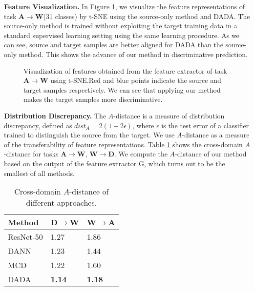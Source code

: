 \documentclass{ecai}
\begin{document}
\textbf{Feature Visualization.} In Figure \ref{Visualization}, we visualize the feature representations of task \textbf{A}$\rightarrow$\textbf{W}(31 classes) by t-SNE\cite{b41} using the source-only method and DADA. The source-only method is trained without exploiting the target training data in a standard supervised learning setting using the same learning procedure. As we can see, source and target samples are better aligned for DADA than the source-only method. This shows the advance of our method in discriminative prediction.

\setlength{\abovecaptionskip}{-0.1cm}  

\begin{figure}[htbp]
\centering
{}
\caption{Visualization of features obtained from the feature extractor of task \textbf{A}$\rightarrow$\textbf{W} using t-SNE\cite{b41}.Red and blue points indicate the source and target samples respectively. We can see that applying our method makes the target samples more discriminative.}
\label{Visualization}
\end{figure}


\textbf{Distribution Discrepancy.} The $A$-distance is a measure of distribution discrepancy, defined as $dist_A = 2 (1-2\epsilon)$, where $\epsilon$ is the test error of a classifier trained to distinguish the source from the target. We use $A$-distance as a measure of the transferability of feature representations. Table \ref{A-distance} shows the cross-domain $A$-distance for tasks \textbf{A}$\rightarrow$\textbf{W}, \textbf{W}$\rightarrow$\textbf{D}. We compute the $A$-distance of our method based on the output of the feature extractor G, which turns out to be the smallest of all methods.

\begin{table}
\centering
\caption{Cross-domain $A$-distance of different approaches.}
\begin{tabular}{lp{2.0cm}<{\centering}p{2.0cm}<{\centering}}
\toprule
Method&   D$\rightarrow$W&   W$\rightarrow$A\\
\midrule
ResNet-50\cite{b36}&  1.27&   1.86\\
DANN\cite{b18}&       1.23&   1.44\\
MCD\cite{b24}&        1.22&   1.60\\
DADA&     \textbf{1.14}& \textbf{1.18}\\
\bottomrule
\end{tabular}
\label{A-distance}
\end{table}
\end{document}
